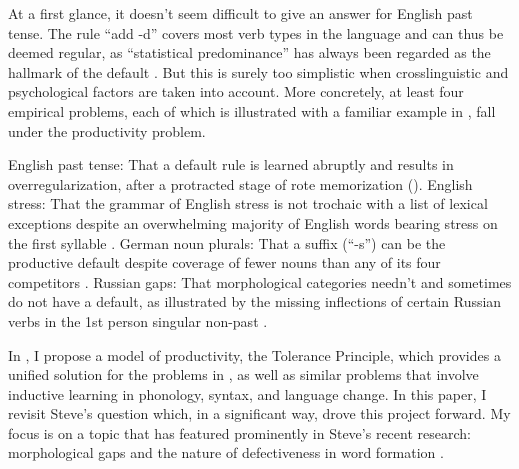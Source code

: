 \documentclass[output=paper,
modfonts
]{LSP/langsci}
\begin{document}
At a
first glance, it 
doesn't seem difficult to give an answer for  English past tense. The
rule ``add -d'' covers most verb types in the language and can thus be
deemed regular,  
as   ``statistical predominance'' has always been regarded as the hallmark of
the default  \citep[e.g.,][p14]{Nida1949}. But this is surely
too simplistic when crosslinguistic and psychological factors
are taken into account.  More 
concretely, at least four empirical problems, each of which is
illustrated with a familiar example in ,  fall under the
productivity problem. 
\begin{exe} \ex \label{four}
\begin{xlist} 
\ex English past tense: That a default rule is learned abruptly and
results in overregularization,  after 
a protracted stage of rote memorization (\citealt{Marcus1992, KLNL}). 
\ex English stress: That the grammar of  English stress \citep{SPE,
  Hayes1982, Halle1987}  is not trochaic with a list of lexical
exceptions despite an overwhelming majority of English
words bearing stress on the first syllable  \citep{Cutler1987,
  LY2013}.  
\ex German noun plurals: That a suffix (``-s'') can be the productive
default despite coverage of fewer nouns than any of its four
competitors
 \citep{Clahsen1992, Wiese1996}. 
\ex Russian gaps: That morphological categories needn't and sometimes
do not have a default, as illustrated by the missing inflections of
certain Russian verbs in the 1st person singular non-past \citep{Halle1973a}. 
\end{xlist} \end{exe}


In \citet{POP}, I propose a model of productivity, the 
Tolerance Principle, which provides a unified solution for 
the problems in , as well as 
similar problems that involve inductive learning in phonology, syntax,
and language change. In this paper, I revisit Steve's question which,
in a significant way, drove this project forward. My focus is on 
a topic that has featured prominently in Steve's recent research:
morphological gaps and the nature of defectiveness in word formation
\citep[e.g.,][]{Anderson2008, 
  Anderson2010b}.   
\end{document}
